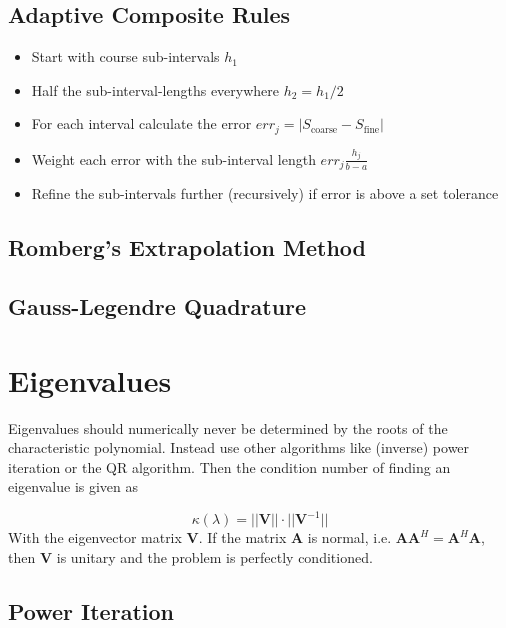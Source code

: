 \documentclass[
    a4paper,
    11pt
]{article}
\begin{document}
\subsection{Adaptive Composite Rules}

\begin{itemize}
    \item Start with course sub-intervals $h_1$
    \item Half the sub-interval-lengths everywhere $h_2=h_1/2$
    \item For each interval calculate the error $err_j = |S_{\text{coarse}} -
        S_{\text{fine}}|$
    \item Weight each error with the sub-interval length $err_j \frac{h_j}{b-a}$
    \item Refine the sub-intervals further (recursively) if error is above a set
        tolerance
\end{itemize}

\subsection{Romberg's Extrapolation Method}

\subsection{Gauss-Legendre Quadrature}


\section{Eigenvalues}

Eigenvalues should numerically never be determined by the roots of the
characteristic polynomial. Instead use other algorithms like (inverse) power
iteration or the QR algorithm. Then the condition number of finding an
eigenvalue is given as

\begin{equation}
    \kappa(\lambda) = ||\mathbf{V}||\cdot||\mathbf{V}^{-1}||
\end{equation}
With the eigenvector matrix $\mathbf{V}$. If the matrix $\mathbf{A}$ is normal,
i.e. $\mathbf{AA}^H = \mathbf{A}^H \mathbf{A}$, then $\mathbf{V}$ is unitary and
the problem is perfectly conditioned.

\subsection{Power Iteration}
\end{document}
